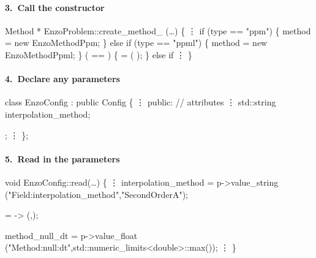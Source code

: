 
\begin{frame}[fragile] 
\secframetitle{\ssAddMethod}
\framesubtitle{3.~Call the  constructor}

\footnotesize
\begin{semiverbatim}
   Method * EnzoProblem::create_method_ (\dots)
   \{
         \vdots
      if (type == "ppm") \{
          method = new EnzoMethodPpm;
      \} else if (type == "ppml") \{
          method = new EnzoMethodPpml;
      \}  ( == ) \{
           =  
             (
              );
      \} else if
         \vdots
   \}
\end{semiverbatim}

\end{frame}


\begin{frame}[fragile, label=sss-add-parameters] 
\secframetitle{\ssAddMethod}
\framesubtitle{4.~Declare any  parameters}

\footnotesize
\begin{semiverbatim}
   class EnzoConfig : public Config \{
        \vdots 
   public: // attributes
        \vdots
     std::string      interpolation_method;

                ;
        \vdots 
   \};
\end{semiverbatim}

\end{frame}


\begin{frame}[fragile] 
\secframetitle{\ssAddMethod}
\framesubtitle{5.~Read in the  parameters}

\footnotesize
\begin{semiverbatim}
   void EnzoConfig::read(\dots)
   \{
        \vdots
      interpolation_method = p->value_string 
        ("Field:interpolation_method","SecondOrderA");

       = ->
        (,);

      method_null_dt = p->value_float 
        ("Method:null:dt",std::numeric_limits<double>::max());
        \vdots
   \}
\end{semiverbatim}

\end{frame}

